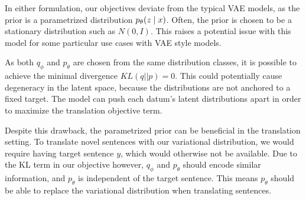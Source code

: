 



In either formulation, our objectives deviate from the typical VAE models, as the prior is a parametrized distribution $p_{\theta}(z \; | \;{x})$. Often, the prior is chosen to be a stationary distribution such as $N(0, I)$. This raises a potential issue with this model for some particular use cases with \ac{VAE} style models. 

As both $q_{\phi}$ and $p_{\theta}$ are chosen from the same distribution classes, it is possible to achieve the minimal divergence $KL(q || p) = 0$. This could potentially cause degeneracy in the latent space, because the distributions are not anchored to a fixed target. The model can push each datum's latent distributions apart in order to maximize the translation objective term. %

Despite this drawback, the parametrized prior can be beneficial in the translation setting. To translate novel sentences with our variational distribution, we would require having target sentence $y$, which would otherwise not be available. Due to the KL term in our objective however, $q_{\phi}$ and $p_{\theta}$ should encode similar information, and $p_{\theta}$ is independent of the target sentence. This means $p_{\theta}$ should be able to replace the variational distribution when translating sentences. %

